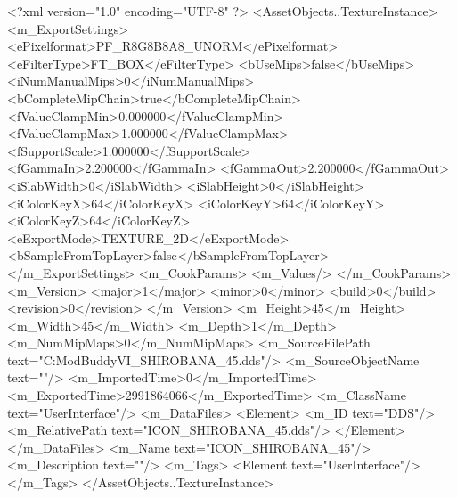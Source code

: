 <?xml version="1.0" encoding="UTF-8" ?>
<AssetObjects..TextureInstance>
	<m_ExportSettings>
		<ePixelformat>PF_R8G8B8A8_UNORM</ePixelformat>
		<eFilterType>FT_BOX</eFilterType>
		<bUseMips>false</bUseMips>
		<iNumManualMips>0</iNumManualMips>
		<bCompleteMipChain>true</bCompleteMipChain>
		<fValueClampMin>0.000000</fValueClampMin>
		<fValueClampMax>1.000000</fValueClampMax>
		<fSupportScale>1.000000</fSupportScale>
		<fGammaIn>2.200000</fGammaIn>
		<fGammaOut>2.200000</fGammaOut>
		<iSlabWidth>0</iSlabWidth>
		<iSlabHeight>0</iSlabHeight>
		<iColorKeyX>64</iColorKeyX>
		<iColorKeyY>64</iColorKeyY>
		<iColorKeyZ>64</iColorKeyZ>
		<eExportMode>TEXTURE_2D</eExportMode>
		<bSampleFromTopLayer>false</bSampleFromTopLayer>
	</m_ExportSettings>
	<m_CookParams>
		<m_Values/>
	</m_CookParams>
	<m_Version>
		<major>1</major>
		<minor>0</minor>
		<build>0</build>
		<revision>0</revision>
	</m_Version>
	<m_Height>45</m_Height>
	<m_Width>45</m_Width>
	<m_Depth>1</m_Depth>
	<m_NumMipMaps>0</m_NumMipMaps>
	<m_SourceFilePath text="C:\Users\asus\Documents\Firaxis ModBuddy\Civilization VI\temppic\ICON_SHIROBANA_45.dds"/>
	<m_SourceObjectName text=""/>
	<m_ImportedTime>0</m_ImportedTime>
	<m_ExportedTime>2991864066</m_ExportedTime>
	<m_ClassName text="UserInterface"/>
	<m_DataFiles>
		<Element>
			<m_ID text="DDS"/>
			<m_RelativePath text="ICON_SHIROBANA_45.dds"/>
		</Element>
	</m_DataFiles>
	<m_Name text="ICON_SHIROBANA_45"/>
	<m_Description text=""/>
	<m_Tags>
		<Element text="UserInterface"/>
	</m_Tags>
</AssetObjects..TextureInstance>

